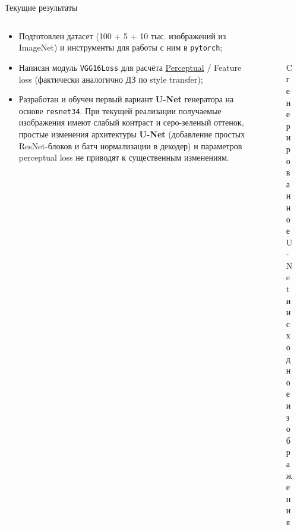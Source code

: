 \documentclass[aspectratio=169]{beamer}
\begin{document}
\begin{frame}{Текущие результаты}
\vspace*{-3mm}
\begin{columns}
    \begin{column}{.65\textwidth}
        \begin{itemize}
            \item Подготовлен датасет (100 + 5 + 10 тыс. изображений из ImageNet) и инструменты для работы с ним в \texttt{pytorch};
            \item Написан модуль \texttt{VGG16Loss} для расчёта \href{https://arxiv.org/abs/1603.08155}{Perceptual} / Feature loss (фактически аналогично ДЗ по style transfer);
            \item Разработан и обучен первый вариант \textbf{U-Net} генератора на основе \texttt{resnet34}. При текущей реализации получаемые изображения имеют слабый контраст и серо-зеленый оттенок, простые изменения архитектуры \textbf{U-Net} (добавление простых ResNet-блоков и батч нормализации в декодер) и параметров perceptual loss не приводят к существенным изменениям.
        \end{itemize}
    \end{column}
    \begin{column}{.35\textwidth}
        \begin{figure}
            \centering
            \includegraphics[scale=.4]{11_unet.jpeg}\\
            \includegraphics[scale=.4]{11_real.jpeg}
            \caption*{Cгенерированное U-Net и исходное изображения}
        \end{figure}
    \end{column}
\end{columns}
\end{frame}
\end{document}
